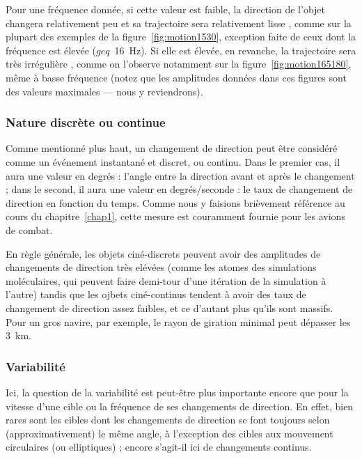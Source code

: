 	Pour une fréquence donnée, si cette valeur est faible, la direction de l'objet changera relativement peu et sa trajectoire sera relativement \og lisse \fg{}, comme sur la plupart des exemples de la figure~\ref{fig:motion1530}, exception faite de ceux dont la fréquence est élevée ($geq$~16~Hz). Si elle est élevée, en revanche, la trajectoire sera très \og irrégulière \fg{}, comme on l'observe notamment sur la figure~\ref{fig:motion165180}, même à basse fréquence (notez que les amplitudes données dans ces figures sont des valeurs maximales --- nous y reviendrons).
	
	\subsubsection{Nature discrète ou continue}
	Comme mentionné plus haut, un changement de direction peut être considéré comme un événement instantané et discret, ou continu. Dans le premier cas, il aura une valeur en degrés : l'angle entre la direction avant et après le changement ; dans le second, il aura une valeur en degrés/seconde : le taux de changement de direction en fonction du temps. Comme nous y faisions brièvement référence au cours du chapitre~\ref{chap1}, cette mesure est couramment fournie pour les avions de combat.
	
	En règle générale, les objets ciné-discrets peuvent avoir des amplitudes de changements de direction très elévées (comme les atomes des simulations moléculaires, qui peuvent faire demi-tour d'une itération de la simulation à l'autre) tandis que les ojbets ciné-continus tendent à avoir des taux de changement de direction assez faibles, et ce d'autant plus qu'ils sont massifs. Pour un gros navire, par exemple, le rayon de giration minimal peut dépasser les 3~km\footnotemark{}.
	
	
	\subsubsection{Variabilité}
	Ici, la question de la variabilité est peut-être plus importante encore que pour la vitesse d'une cible ou la fréquence de ses changements de direction. En effet, bien rares sont les cibles dont les changements de direction se font toujours selon (approximativement) le même angle, à l'exception des cibles aux mouvement circulaires (ou elliptiques) ; encore s'agit-il ici de changements continus.
	
